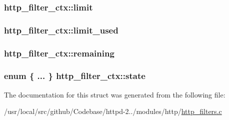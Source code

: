 \subsubsection[{\texorpdfstring{limit}{limit}}]{ http\+\_\+filter\+\_\+ctx\+::limit}\hypertarget{structhttp__filter__ctx_ae3dfd19fe37ee4d2d690ca352f6d8601}{}\label{structhttp__filter__ctx_ae3dfd19fe37ee4d2d690ca352f6d8601}
\subsubsection[{\texorpdfstring{limit\+\_\+used}{limit_used}}]{ http\+\_\+filter\+\_\+ctx\+::limit\+\_\+used}\hypertarget{structhttp__filter__ctx_a39ce71ac22882c37594f7ff5a1d6bbe6}{}\label{structhttp__filter__ctx_a39ce71ac22882c37594f7ff5a1d6bbe6}
\subsubsection[{\texorpdfstring{remaining}{remaining}}]{ http\+\_\+filter\+\_\+ctx\+::remaining}\hypertarget{structhttp__filter__ctx_a669e4805b3738b515c0bc6d56f0f7ea7}{}\label{structhttp__filter__ctx_a669e4805b3738b515c0bc6d56f0f7ea7}
\subsubsection[{\texorpdfstring{state}{state}}]{\setlength{\rightskip}{0pt plus 5cm}enum \{ ... \}   http\+\_\+filter\+\_\+ctx\+::state}\hypertarget{structhttp__filter__ctx_a2e84a1c737dd4daa565b328c875402cb}{}\label{structhttp__filter__ctx_a2e84a1c737dd4daa565b328c875402cb}


The documentation for this struct was generated from the following file\+:\begin{DoxyCompactItemize}
\item 
/usr/local/src/github/\+Codebase/httpd-\/2../modules/http/\hyperlink{http__filters_8c}{http\+\_\+filters.\+c}\end{DoxyCompactItemize}

